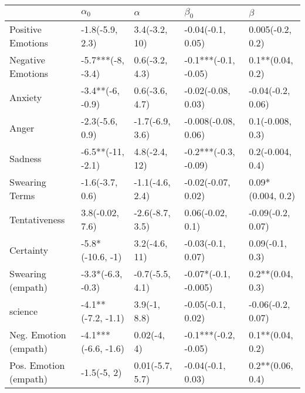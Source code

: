 \begin{tabular}{lllll}
\toprule
{} &           $\alpha_0$ &         $\alpha$ &             $\beta_0$ &            $\beta$ \\
\midrule
Positive Emotions     &      -1.8(-5.9, 2.3) &    3.4(-3.2, 10) &     -0.04(-0.1, 0.05) &   0.005(-0.2, 0.2) \\
Negative Emotions     &    -5.7***(-8, -3.4) &   0.6(-3.2, 4.3) &  -0.1***(-0.1, -0.05) &   0.1**(0.04, 0.2) \\
Anxiety               &     -3.4**(-6, -0.9) &   0.6(-3.6, 4.7) &    -0.02(-0.08, 0.03) &  -0.04(-0.2, 0.06) \\
Anger                 &      -2.3(-5.6, 0.9) &  -1.7(-6.9, 3.6) &   -0.008(-0.08, 0.06) &   0.1(-0.008, 0.3) \\
Sadness               &    -6.5**(-11, -2.1) &    4.8(-2.4, 12) &  -0.2***(-0.3, -0.09) &   0.2(-0.004, 0.4) \\
Swearing Terms        &      -1.6(-3.7, 0.6) &  -1.1(-4.6, 2.4) &    -0.02(-0.07, 0.02) &  0.09*(0.004, 0.2) \\
Tentativeness         &      3.8(-0.02, 7.6) &  -2.6(-8.7, 3.5) &      0.06(-0.02, 0.1) &  -0.09(-0.2, 0.07) \\
Certainty             &     -5.8*(-10.6, -1) &    3.2(-4.6, 11) &     -0.03(-0.1, 0.07) &    0.09(-0.1, 0.3) \\
Swearing (empath)     &    -3.3*(-6.3, -0.3) &  -0.7(-5.5, 4.1) &  -0.07*(-0.1, -0.005) &   0.2**(0.04, 0.3) \\
science               &   -4.1**(-7.2, -1.1) &     3.9(-1, 8.8) &     -0.05(-0.1, 0.02) &  -0.06(-0.2, 0.07) \\
Neg. Emotion (empath) &  -4.1***(-6.6, -1.6) &      0.02(-4, 4) &  -0.1***(-0.2, -0.05) &   0.1**(0.04, 0.2) \\
Pos. Emotion (empath) &          -1.5(-5, 2) &  0.01(-5.7, 5.7) &     -0.04(-0.1, 0.03) &   0.2**(0.06, 0.4) \\
\bottomrule
\end{tabular}
